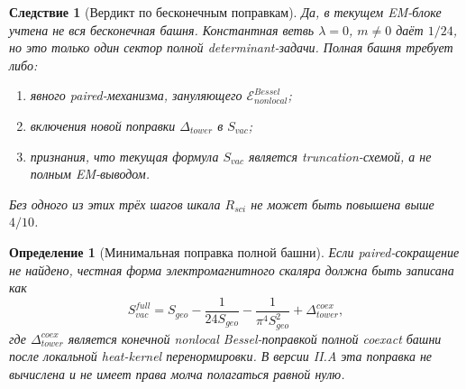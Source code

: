 \documentclass[12pt,a4paper]{report}
\newtheorem{definition}{Определение}[chapter]
\newtheorem{corollary}{Следствие}[chapter]
\theoremstyle{remark}
\begin{document}
\begin{corollary}[Вердикт по бесконечным поправкам]
Да, в текущем EM-блоке учтена не вся бесконечная башня. Константная ветвь \(\lambda=0\), \(m\neq0\) даёт \(1/24\), но это только один сектор полной determinant-задачи. Полная башня требует либо:
\begin{enumerate}
    \item явного paired-механизма, зануляющего \(\mathcal{E}_{nonlocal}^{Bessel}\);
    \item включения новой поправки \(\Delta_{tower}\) в \(S_{vac}\);
    \item признания, что текущая формула \(S_{vac}\) является truncation-схемой, а не полным EM-выводом.
\end{enumerate}
Без одного из этих трёх шагов шкала \(R_{sci}\) не может быть повышена выше \(4/10\).
\end{corollary}

\begin{definition}[Минимальная поправка полной башни]
Если paired-сокращение не найдено, честная форма электромагнитного скаляра должна быть записана как
\begin{equation}
    S_{vac}^{full}=S_{geo}-\frac{1}{24S_{geo}}-\frac{1}{\pi^4S_{geo}^2}+\Delta_{tower}^{coex},
\end{equation}
где \(\Delta_{tower}^{coex}\) является конечной nonlocal Bessel-поправкой полной coexact башни после локальной heat-kernel перенормировки. В версии II.A эта поправка не вычислена и не имеет права молча полагаться равной нулю.
\end{definition}
\end{document}
